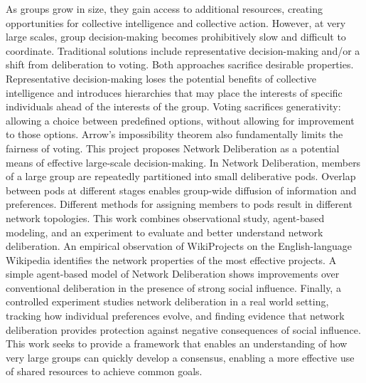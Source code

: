 As groups grow in size, they gain access to additional resources, creating opportunities for collective intelligence and collective action.
However, at very large scales, group decision-making becomes prohibitively slow and difficult to coordinate.
Traditional solutions include representative decision-making and/or a shift from deliberation to voting.
Both approaches sacrifice desirable properties.
Representative decision-making loses the potential benefits of collective intelligence and introduces hierarchies that may place the interests of specific individuals ahead of the interests of the group.
Voting sacrifices generativity: allowing a choice between predefined options, without allowing for improvement to those options.
Arrow’s impossibility theorem also fundamentally limits the fairness of voting.
This project proposes Network Deliberation as a potential means of effective large-scale decision-making.
In Network Deliberation, members of a large group are repeatedly partitioned into small deliberative pods.
Overlap between pods at different stages enables group-wide diffusion of information and preferences.
Different methods for assigning members to pods result in different network topologies.
This work combines observational study, agent-based modeling, and an experiment to evaluate and better understand network deliberation.
An empirical observation of WikiProjects on the English-language Wikipedia identifies the network properties of the most effective projects.
A simple agent-based model of Network Deliberation shows improvements over conventional deliberation in the presence of strong social influence.
Finally, a controlled experiment studies network deliberation in a real world setting, tracking how individual preferences evolve, and finding evidence that network deliberation provides protection against negative consequences of social influence.
This work seeks to provide a framework that enables an understanding of
how very large groups can quickly develop a consensus, enabling a more effective use of shared resources to achieve common goals.